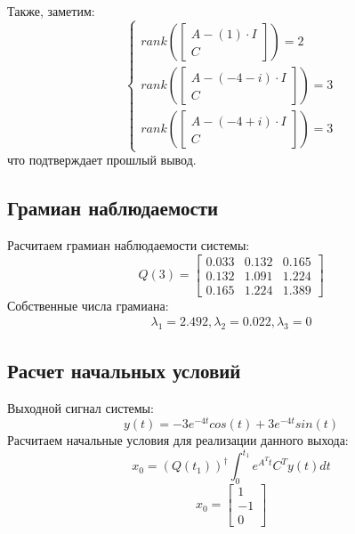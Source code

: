Также, заметим:
\begin{equation*}
    \begin{cases}
        rank(\begin{bmatrix}
            A - (1)\cdot I \\  C
        \end{bmatrix} ) = 2 \\
        rank(\begin{bmatrix}
            A - (-4-i)\cdot I \\ C
        \end{bmatrix} ) = 3 \\
        rank(\begin{bmatrix}
            A - (-4+i)\cdot I \\ C
        \end{bmatrix} ) = 3
    \end{cases}
\end{equation*}
что подтверждает прошлый вывод.

\subsection{Грамиан наблюдаемости}
Расчитаем грамиан наблюдаемости системы:
\begin{equation*}
    Q(3) = \begin{bmatrix}
        0.033 & 0.132 & 0.165 \\
        0.132 & 1.091 & 1.224 \\
        0.165 & 1.224 & 1.389
        \end{bmatrix}
\end{equation*}
Собственные числа грамиана:
\begin{eqnarray*}
    \lambda_1 = 2.492, \lambda_2 = 0.022, \lambda_3 = 0
\end{eqnarray*}

\subsection{Расчет начальных условий}
Выходной сигнал системы:
\begin{equation*}
    y(t) = -3e^{-4t}cos(t) + 3e^{-4t}sin(t)
\end{equation*}
Расчитаем начальные условия для реализации данного выхода:
\begin{equation}
    x_0 = (Q(t_1))^{\dagger}\int_{0}^{t_1}e^{A^Tt}C^Ty(t)dt
\end{equation}
\begin{equation*}
    x_0 = \begin{bmatrix}
        1 \\ -1 \\ 0
    \end{bmatrix}
\end{equation*}

